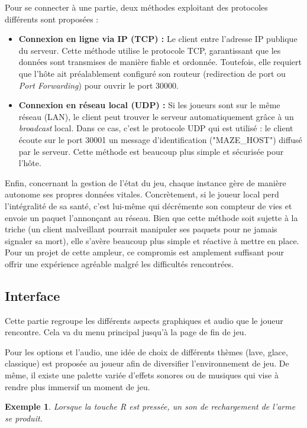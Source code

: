 \documentclass[a4paper,11pt]{article}
\newtheorem{exemple}{Exemple}
\begin{document}
Pour se connecter à une partie, deux méthodes exploitant des protocoles différents sont proposées :
\begin{itemize}
    \item \textbf{Connexion en ligne via IP (TCP) :} Le client entre l'adresse IP publique du serveur. Cette méthode utilise le protocole TCP, garantissant que 
    les données sont transmises de manière fiable et ordonnée. Toutefois, elle requiert que l'hôte ait préalablement configuré son routeur (redirection de port 
    ou \emph{Port Forwarding}) pour ouvrir le port 30000.
    \item \textbf{Connexion en réseau local (UDP) :} Si les joueurs sont sur le même réseau (LAN), le client peut trouver le serveur automatiquement grâce à un 
    \emph{broadcast} local. Dans ce cas, c'est le protocole UDP qui est utilisé : le client écoute sur le port 30001 un message d'identification ("MAZE\_HOST") 
    diffusé par le serveur. Cette méthode est beaucoup plus simple et sécurisée pour l'hôte.


\end{itemize}
Enfin, concernant la gestion de l'état du jeu, chaque instance gère de manière autonome ses propres données vitales. Concrètement, si le joueur local perd 
l'intégralité de sa santé, c'est lui-même qui décrémente son compteur de vies et envoie un paquet l'annonçant au réseau. Bien que cette méthode soit sujette 
à la triche (un client malveillant pourrait manipuler ses paquets pour ne jamais signaler sa mort), elle s'avère beaucoup plus simple et réactive à mettre en 
place. Pour un projet de cette ampleur, ce compromis est amplement suffisant pour offrir une expérience agréable malgré les difficultés rencontrées.



\subsection{Interface}\label{Interface}
\hspace*{1.5em}
Cette partie regroupe les différents aspects graphiques et audio que le joueur rencontre. Cela va du menu principal jusqu'à la page de fin de jeu.

Pour les options et l'audio, une idée de choix de différents thèmes (lave, glace, classique) est proposée au joueur afin de diversifier l'environnement de jeu. De même, il existe une palette variée d'effets sonores ou de musiques qui vise à rendre plus immersif un moment de jeu.
\begin{exemple}
Lorsque la touche R est pressée, un son de rechargement de l'arme se produit.
\end{exemple}
\end{document}

